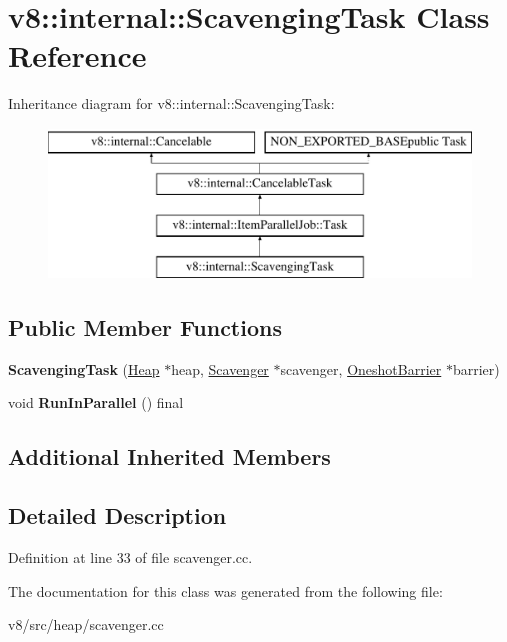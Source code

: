 \hypertarget{classv8_1_1internal_1_1ScavengingTask}{}\section{v8\+:\+:internal\+:\+:Scavenging\+Task Class Reference}
\label{classv8_1_1internal_1_1ScavengingTask}
Inheritance diagram for v8\+:\+:internal\+:\+:Scavenging\+Task\+:\begin{figure}[H]
\begin{center}
\leavevmode
\includegraphics[height=4.000000cm]{classv8_1_1internal_1_1ScavengingTask}
\end{center}
\end{figure}
\subsection*{Public Member Functions}
\begin{DoxyCompactItemize}
\item 
\mbox{\label{classv8_1_1internal_1_1ScavengingTask_a51c3c3e45a558e0cb42fdbe4bded3ee9}} 
{\bfseries Scavenging\+Task} (\mbox{\hyperlink{classv8_1_1internal_1_1Heap}{Heap}} $\ast$heap, \mbox{\hyperlink{classv8_1_1internal_1_1Scavenger}{Scavenger}} $\ast$scavenger, \mbox{\hyperlink{classv8_1_1internal_1_1OneshotBarrier}{Oneshot\+Barrier}} $\ast$barrier)
\item 
\mbox{\label{classv8_1_1internal_1_1ScavengingTask_a048d8b69a06225f8b3e40bafa2381833}} 
void {\bfseries Run\+In\+Parallel} () final
\end{DoxyCompactItemize}
\subsection*{Additional Inherited Members}


\subsection{Detailed Description}


Definition at line 33 of file scavenger.\+cc.



The documentation for this class was generated from the following file\+:\begin{DoxyCompactItemize}
\item 
v8/src/heap/scavenger.\+cc\end{DoxyCompactItemize}
